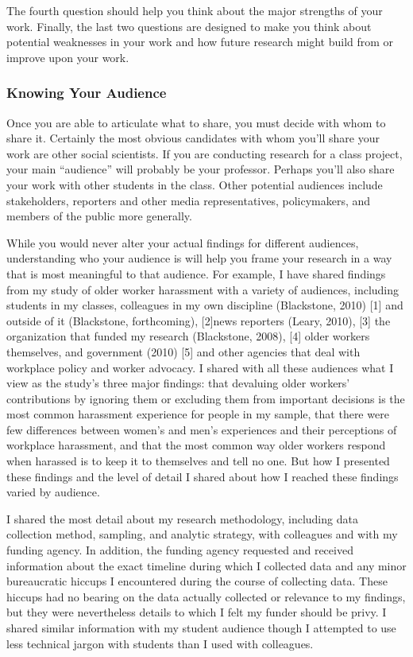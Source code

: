 The fourth question should help you think about the major strengths of your work. Finally, the last two questions are designed to make you think about potential weaknesses in your work and how future research might build from or improve upon your work.

\subsubsection{Knowing Your Audience}

Once you are able to articulate what to share, you must decide with whom to share it. Certainly the most obvious candidates with whom you’ll share your work are other social scientists. If you are conducting research for a class project, your main “audience” will probably be your professor. Perhaps you’ll also share your work with other students in the class. Other potential audiences include stakeholders, reporters and other media representatives, policymakers, and members of the public more generally.

While you would never alter your actual findings for different audiences, understanding who your audience is will help you frame your research in a way that is most meaningful to that audience. For example, I have shared findings from my study of older worker harassment with a variety of audiences, including students in my classes, colleagues in my own discipline (Blackstone, 2010) [1] and outside of it (Blackstone, forthcoming), [2]news reporters (Leary, 2010), [3] the organization that funded my research (Blackstone, 2008), [4] older workers themselves, and government (2010) [5] and other agencies that deal with workplace policy and worker advocacy. I shared with all these audiences what I view as the study’s three major findings: that devaluing older workers’ contributions by ignoring them or excluding them from important decisions is the most common harassment experience for people in my sample, that there were few differences between women’s and men’s experiences and their perceptions of workplace harassment, and that the most common way older workers respond when harassed is to keep it to themselves and tell no one. But how I presented these findings and the level of detail I shared about how I reached these findings varied by audience.

I shared the most detail about my research methodology, including data collection method, sampling, and analytic strategy, with colleagues and with my funding agency. In addition, the funding agency requested and received information about the exact timeline during which I collected data and any minor bureaucratic hiccups I encountered during the course of collecting data. These hiccups had no bearing on the data actually collected or relevance to my findings, but they were nevertheless details to which I felt my funder should be privy. I shared similar information with my student audience though I attempted to use less technical jargon with students than I used with colleagues.

